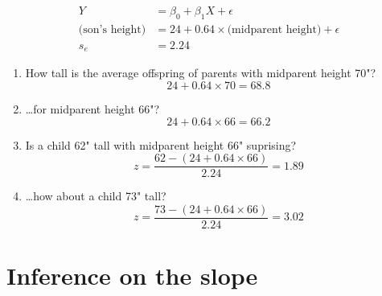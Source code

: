 \begin{frame}{}
  \begin{center}
    \begin{align*} 
      Y &= \beta_0 + \beta_1 X + \epsilon \\
      \text{(son's height)} &= 24 + 0.64 \times \text{(midparent height)}  + \epsilon\\
      s_e &= 2.24
    \end{align*}
  \end{center}
  \begin{enumerate}
    \item How tall is the average offspring of parents with midparent height 70"?
      \pause
      \[  24 + 0.64 \times 70  = 68.8 \]
      \pause
    \item \ldots for midparent height 66"?
      \pause
      \[  24 + 0.64 \times 66  = 66.2 \]
      \pause
    \item Is a child 62" tall with midparent height 66" suprising?
      \pause
      \[  z = \frac{62 - (24+0.64\times 66)}{2.24} = 1.89 \]
      \pause
    \item \ldots how about a child 73" tall?
      \pause
      \[  z = \frac{73 - (24+0.64\times 66)}{2.24} = 3.02 \]
  \end{enumerate}

\end{frame}


\section{Inference on the slope}

